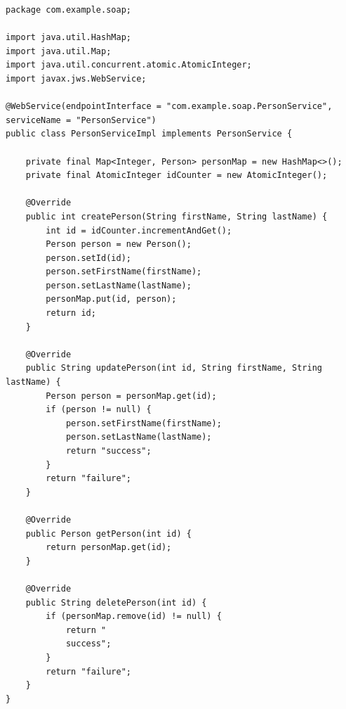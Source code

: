 \documentclass[../vs-script-first-v01.tex]{subfiles}
\begin{document}
\begin{lstlisting}[caption={SOAP Person Service Implementierung},captionpos=b,label={lst:soap_person_impl}]
package com.example.soap;

import java.util.HashMap;
import java.util.Map;
import java.util.concurrent.atomic.AtomicInteger;
import javax.jws.WebService;

@WebService(endpointInterface = "com.example.soap.PersonService", serviceName = "PersonService")
public class PersonServiceImpl implements PersonService {

    private final Map<Integer, Person> personMap = new HashMap<>();
    private final AtomicInteger idCounter = new AtomicInteger();

    @Override
    public int createPerson(String firstName, String lastName) {
        int id = idCounter.incrementAndGet();
        Person person = new Person();
        person.setId(id);
        person.setFirstName(firstName);
        person.setLastName(lastName);
        personMap.put(id, person);
        return id;
    }

    @Override
    public String updatePerson(int id, String firstName, String lastName) {
        Person person = personMap.get(id);
        if (person != null) {
            person.setFirstName(firstName);
            person.setLastName(lastName);
            return "success";
        }
        return "failure";
    }

    @Override
    public Person getPerson(int id) {
        return personMap.get(id);
    }

    @Override
    public String deletePerson(int id) {
        if (personMap.remove(id) != null) {
            return "
            success";
        }
        return "failure";
    }
}
\end{lstlisting}
\end{document}

